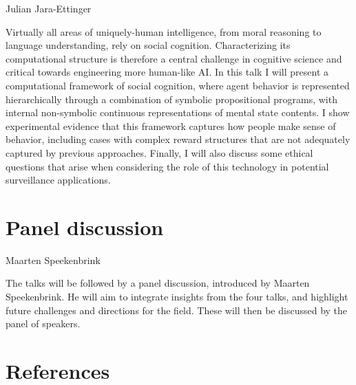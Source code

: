 \documentclass[10pt, letterpaper]{article}
\begin{document}
\begin{center}
Julian Jara-Ettinger
\end{center}

Virtually all areas of uniquely-human intelligence, from moral reasoning
to language understanding, rely on social cognition. Characterizing its
computational structure is therefore a central challenge in cognitive
science and critical towards engineering more human-like AI. In this
talk I will present a computational framework of social cognition, where
agent behavior is represented hierarchically through a combination of
symbolic propositional programs, with internal non-symbolic continuous
representations of mental state contents. I show experimental evidence
that this framework captures how people make sense of behavior,
including cases with complex reward structures that are not adequately
captured by previous approaches. Finally, I will also discuss some
ethical questions that arise when considering the role of this
technology in potential surveillance applications.

\hypertarget{panel-discussion}{%
\section{Panel discussion}\label{panel-discussion}}

\begin{center}
Maarten Speekenbrink
\end{center}

The talks will be followed by a panel discussion, introduced by Maarten
Speekenbrink. He will aim to integrate insights from the four talks, and
highlight future challenges and directions for the field. These will
then be discussed by the panel of speakers.

\hypertarget{references}{%
\section{References}\label{references}}

\setlength{\parindent}{-0.1in} 
\setlength{\leftskip}{0.125in}

\noindent
\end{document}
